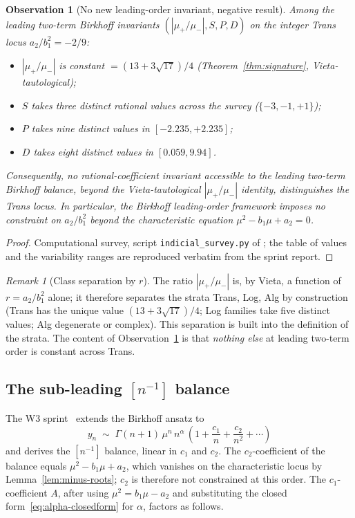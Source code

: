 \documentclass[11pt]{amsart}
\newtheorem{observation}[theorem]{Observation}
\theoremstyle{definition}
\theoremstyle{remark}
\newtheorem{remark}[theorem]{Remark}
\begin{document}
\begin{observation}[No new leading-order invariant, negative result]
\label{prop:leading-invariant}
Among the leading two-term Birkhoff invariants
$(|\mu_+/\mu_-|, S, P, D)$ on the integer Trans locus
$a_2/b_1^2 = -2/9$:
\begin{itemize}[leftmargin=1.4em]
\item $|\mu_+/\mu_-|$ is constant $= (13+3\sqrt{17})/4$
(Theorem~\ref{thm:signature}, Vieta-tautological);
\item $S$ takes three distinct rational values across the survey
($\{-3,-1,+1\}$);
\item $P$ takes nine distinct values in $[-2.235,+2.235]$;
\item $D$ takes eight distinct values in $[0.059,9.94]$.
\end{itemize}
Consequently, no rational-coefficient invariant accessible to the
leading two-term Birkhoff balance, beyond the Vieta-tautological
$|\mu_+/\mu_-|$ identity, distinguishes the Trans locus.
In particular, the Birkhoff leading-order framework imposes no
constraint on $a_2/b_1^2$ beyond the characteristic equation
$\mu^2 - b_1\mu + a_2 = 0$.
\end{observation}
\begin{proof}
Computational survey, script \texttt{indicial\_survey.py} of
\cite{SprintW2Report}; the table of values and the variability ranges
are reproduced verbatim from the sprint report.
\end{proof}

\begin{remark}[Class separation by $r$]
The ratio $|\mu_+/\mu_-|$ is, by Vieta, a function of $r=a_2/b_1^2$
alone; it therefore separates the strata Trans, Log, Alg by
construction (Trans has the unique value $(13+3\sqrt{17})/4$; Log
families take five distinct values; Alg degenerate or complex).
This separation is built into the definition of the strata.  The
content of Observation~\ref{prop:leading-invariant} is that
\emph{nothing else} at leading two-term order is constant across
Trans.
\end{remark}

\subsection{The sub-leading $[n^{-1}]$ balance}\label{sec:subleading}

The W3 sprint~\cite{SprintW3Report} extends the Birkhoff ansatz to
\[
  y_n \;\sim\; \Gamma(n+1)\,\mu^n\,n^\alpha\,
  \left(1 + \frac{c_1}{n} + \frac{c_2}{n^2} + \cdots\right)
\]
and derives the $[n^{-1}]$ balance, linear in $c_1$ and $c_2$.  The
$c_2$-coefficient of the balance equals $\mu^2 - b_1\mu + a_2$, which
vanishes on the characteristic locus by Lemma~\ref{lem:minus-roots};
$c_2$ is therefore not constrained at this order.  The
$c_1$-coefficient $A$, after using $\mu^2 = b_1\mu - a_2$ and
substituting the closed form~\eqref{eq:alpha-closedform} for $\alpha$,
factors as follows.
\end{document}
